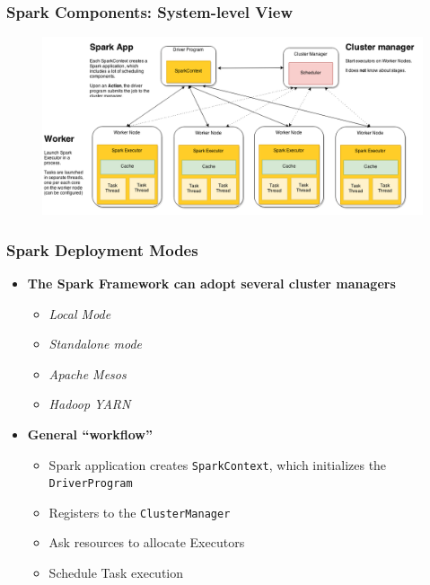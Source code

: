 \begin{frame}
\frametitle{Spark Components: System-level View}
	\begin{figure}[h]
	  \centering
	  \includegraphics[scale=0.33]{./Figures/spark_system}
	  \label{fig:spark_components}
	\end{figure}
\end{frame}

\begin{frame}
\frametitle{Spark Deployment Modes}
\begin{itemize}
	\item {\bf The Spark Framework can adopt several cluster managers}
	\begin{itemize}
		\item \emph{Local Mode}
		\item \emph{Standalone mode}
		\item \emph{Apache Mesos}
		\item \emph{Hadoop YARN}
	\end{itemize}

	\vspace{20pt}

	\item {\bf General ``workflow''}
	\begin{itemize}
		\item Spark application creates \texttt{SparkContext}, which initializes the \texttt{DriverProgram}
		\item Registers to the \texttt{ClusterManager}
		\item Ask resources to allocate Executors
		\item Schedule Task execution
	\end{itemize}
\end{itemize}
\end{frame}

